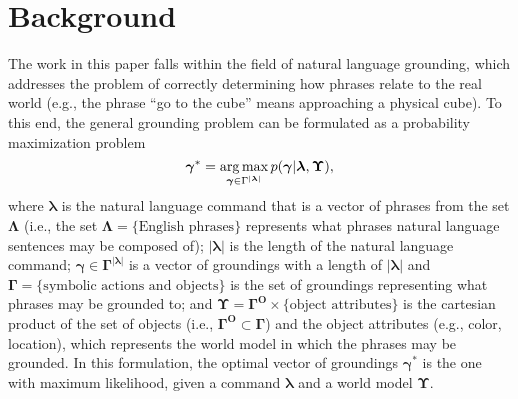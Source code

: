 \section{Background}
\label{sec:background}
The work in this paper falls within the field of natural language grounding, which addresses the problem of correctly determining how phrases relate to the real world (e.g., the phrase ``go to the cube'' means approaching a physical cube).
To this end, the general grounding problem can be formulated as a probability maximization problem
\begin{equation}
\boldsymbol{\gamma}^* = \operatorname*{\arg\max}_{\boldsymbol{\gamma} \in \Gamma^{|\boldsymbol{\lambda}|}} p(\boldsymbol{\gamma}|\boldsymbol{\lambda},\boldsymbol\Upsilon),
\label{eq:max_ground_prob}
\end{equation}
where $\boldsymbol{\lambda}$ is the natural language command that is a vector of phrases from the set $\boldsymbol\Lambda$ (i.e.,  the set ${\boldsymbol\Lambda = \{\text{English phrases}\}}$ represents what phrases natural language sentences may be composed of); $|\boldsymbol{\lambda}|$ is the length of the natural language command; $\boldsymbol{\gamma} \in \boldsymbol\Gamma^{|\boldsymbol{\lambda}|}$ is a vector of groundings with a length of $|\boldsymbol{\lambda}|$ and ${\boldsymbol\Gamma = \{\text{symbolic actions and objects\}}}$ is the set of groundings representing what phrases may be grounded to; and ${\boldsymbol\Upsilon = \boldsymbol{\Gamma^O} \times \{\text{object attributes}\} }$ is the cartesian product of the set of objects (i.e., $\boldsymbol{\Gamma^O} \subset \boldsymbol\Gamma$) and the object attributes (e.g., color, location), which represents the world model in which the phrases may be grounded. In this formulation, the optimal vector of groundings $\boldsymbol{\gamma}^*$ is the one with maximum likelihood, given a command $\boldsymbol{\lambda}$ and a world model $\boldsymbol\Upsilon$.


